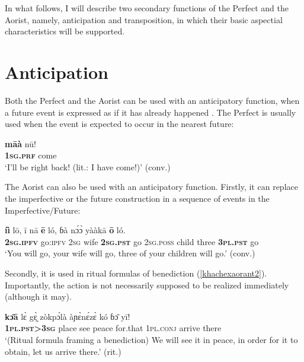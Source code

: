 \documentclass[output=paper,newtxmath,modfonts,nonflat,hidelinks]{langsci/langscibook}
\begin{document}
In what follows, I will describe two secondary functions of the Perfect and the Aorist, namely, anticipation and transposition, in which their basic aspectial characteristics will be supported.

\section{Anticipation}
\label{khachs4}
Both the Perfect and the Aorist can be used with an anticipatory function, when a future event is expressed as if it has already happened \citep[cf.][224]{khachhanks1990}. The Perfect is usually used when the event is expected to occur in the nearest future:

\begin{exe} \ex
\gll	\textbf{māà}	nū!\\
	\textbf{1\textsc{sg}.\textsc{prf}}	come\\
\glt ‘I’ll be right back! (lit.: I have come!)’ (conv.)
\end{exe}

The Aorist can also be used with an anticipatory function. Firstly, it can replace the imperfective or the future construction in a sequence of events in the Imperfective/Future:

\begin{exe} \ex
\gll	\textbf{íì}	lō,	ī	nā	\textbf{ē}	ló,	ɓà	nɔ́ɔ̀	yààkā	\textbf{ō}	ló.\\
	\textbf{2\textsc{sg}.\textsc{ipfv}}	go:\textsc{ipfv}	2\textsc{sg}	wife	\textbf{2\textsc{sg}.\textsc{pst}}	go	2\textsc{sg}.\textsc{poss}	child	three	\textbf{3\textsc{pl}.\textsc{pst}}	go\\
\glt ‘You will go, your wife will go, three of your children will go.’ (conv.)
\end{exe}

Secondly, it is used in ritual formulas of benediction (\ref{khachexaorant2}). Importantly, the action is not necessarily supposed to be realized immediately (although it may).

\begin{exe} \ex
\label{khachexaorant2}
\gll 	\textbf{kɔ̄ā}	lɛ̀	gɛ̰̀	zòkpɔ́là	àɲɛ̀nɛ́zɛ̀	kó	ɓɔ̄	yī!\\
	\textbf{1\textsc{pl}.\textsc{pst}>3\textsc{sg}}	place	see	peace	for.that	1\textsc{pl}.\textsc{conj}	arrive	there\\
\glt ‘(Ritual formula framing a benediction) We will see it in peace, in order for it to obtain, let us arrive there.’ (rit.)
\end{exe}
\end{document}
